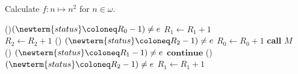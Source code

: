 \begin{problem}
\begin{answer}
    \newpage
    \begin{algorithm}[H]
      \caption{Calculate $f: n \mapsto n^2$ for $n \in \omega$.}
        \While(){$(\newterm{status} \coloneq R_0 - 1) \neq e$}{
          $R_1 \gets R_1 + 1$ \\
          $R_2 \gets R_2 + 1$
        }
        \While() {$(\newterm{status} \coloneq R_2 - 1) \neq e$}{
          $R_0 \gets R_0 + 1$
        }
        \textbf{call} $M$  \\
        \While() {$(\newterm{status} \coloneq R_1 - 1) \neq e$}{
          $\mathbf{continue}$
        }
        \While() {$(\newterm{status} \coloneq R_2 - 1) \neq e$}{
          $R_1 \gets R_1 + 1$
        }
    \end{algorithm}
  \end{answer}
\end{problem}
